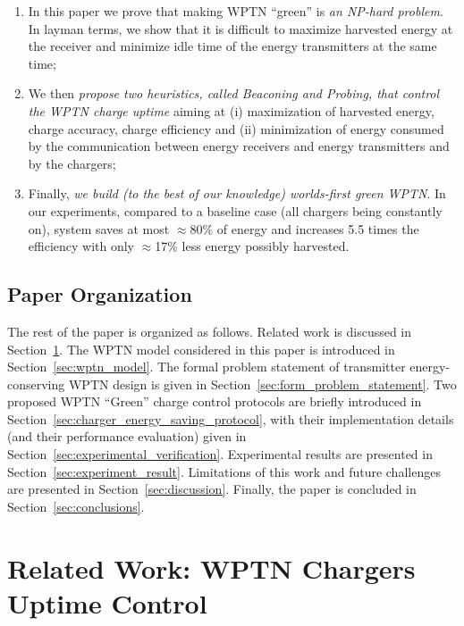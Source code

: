 \documentclass[11pt,draftclsnofoot,journal,onecolumn]{IEEEtran}
\begin{document}
\begin{enumerate}
\item In this paper we prove that making WPTN ``green'' is \emph{an NP-hard problem}. In layman terms, we show that it is difficult to maximize harvested energy at the receiver and minimize idle time of the energy transmitters at the same time;

\item We then \emph{propose two heuristics, called Beaconing and Probing, that control the WPTN charge uptime} aiming at (i) maximization of harvested energy, charge accuracy, charge efficiency and (ii) minimization of energy consumed by the communication between energy receivers and energy transmitters and by the chargers;
 
\item Finally, \emph{we build (to the best of our knowledge) worlds-first green WPTN}. In our experiments, compared to a baseline case (all chargers being constantly on), system saves at most $\approx$80\% of energy and increases 5.5 times the efficiency with only $\approx$17\% less energy possibly harvested.

\end{enumerate}

\subsection{Paper Organization}
\label{sec:paper_organization}

The rest of the paper is organized as follows. Related work is discussed in Section~\ref{sec:related_work}. The WPTN model considered in this paper is introduced in Section~\ref{sec:wptn_model}. The formal problem statement of transmitter energy-conserving WPTN design is given in Section~\ref{sec:form_problem_statement}. Two proposed WPTN ``Green'' charge control protocols are briefly introduced in Section~\ref{sec:charger_energy_saving_protocol}, with their implementation details (and their performance evaluation) given in Section~\ref{sec:experimental_verification}. Experimental results are presented in Section~\ref{sec:experiment_result}. Limitations of this work and future challenges are presented in Section~\ref{sec:discussion}. Finally, the paper is concluded in Section~\ref{sec:conclusions}.

\section{Related Work: WPTN Chargers Uptime Control}
\label{sec:related_work}
\end{document}
